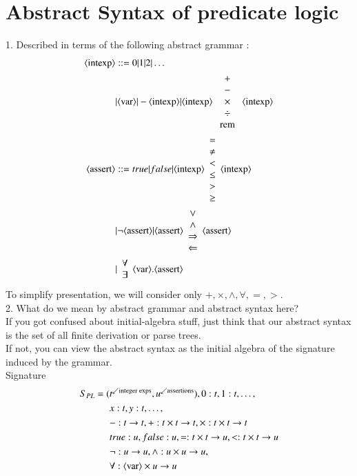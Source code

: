 \documentclass{report}[12pt]
\begin{document}
\section{Abstract Syntax of predicate logic}
1. Described in terms of the following abstract grammar : \\
\begin{align*}
    \langle \text{intexp}\rangle &::= 0 | 1 | 2 | \ldots \\
    &| \langle \text{var}\rangle | -\langle \text{intexp}\rangle | \langle \text{intexp}\rangle \begin{array}{c} + \\ - \\ \times \\ \div \\ \text{ rem } \end{array} \langle \text{intexp}\rangle \\
    \langle \text{assert}\rangle &::= true | false | \langle \text{intexp}\rangle \begin{array}{c} = \\ \neq \\ < \\ \le \\ > \\ \ge \end{array} \langle \text{intexp}\rangle \\
    &| \neg \langle \text{assert}\rangle | \langle \text{assert}\rangle \begin{array}{c} \vee \\ \wedge \\ \Rightarrow \\ \Leftarrow \end{array} \langle \text{assert}\rangle \\
    &| \begin{array}{c} \forall \\ \exists \end{array} \langle \text{var}\rangle. \langle \text{assert}\rangle
\end{align*}
To simplify presentation, we will consider only $+, \times, \wedge, \forall, =, >$. \\
2. What do we mean by abstract grammar and abstract syntax here? \\
If you got confused about initial-algebra stuff, just think that our abstract syntax is the set of all finite derivation or parse trees. \\
If not, you can view the abstract syntax as the initial algebra of the signature induced by the grammar. \\
Signature
\begin{align*}
    S_{PL} = (&t^{\swarrow \text{integer exps}}, u^{\swarrow \text{assertions}}), 0:t, 1:t, \ldots, \\
    &x:t, y:t, \ldots, \\
    &-:t\rightarrow t, +:t \times t \rightarrow t, \times : t \times t \rightarrow t \\
    &true : u, false : u, =:t \times t \rightarrow u, < : t\times t \rightarrow u \\
    &\neg : u \rightarrow u, \wedge : u \times u \rightarrow u, \\
    &\forall : \langle \text{var}\rangle \times u \rightarrow u
\end{align*}
\end{document}
